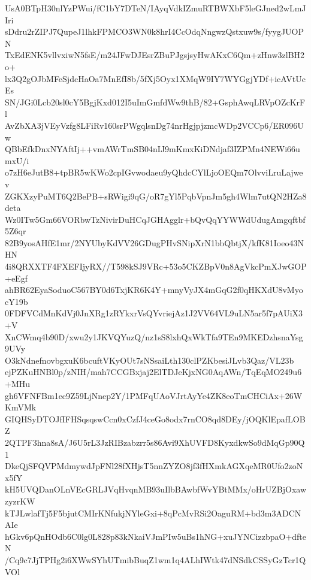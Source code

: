 UsA0BTpH30nlYzPWui/fC1bY7DTeN/IAyqVdkIZmuRTBWXbF5leGJned2wLmJIri
sDdru2rZIPJ7QupeJ1lhkFPMCO3WN0k8hrI4CcOdqNngwzQstxuw9s/fyygJUOPN
TxEdENK5vllvxiwN5fsE/m24JFwDJEsrZBuPJgsjsyHwAKxC6Qm+zHnw3zlBH2o+
lx3Q2gOJbMFeSjdcHaOa7MnEfI8b/5fXj5Oyx1XMqW9IY7WYGgjYDf+icAVtUcEs
SN/JGi0Lcb20sl0cY5BgjKxd012I5uImGmfdWw9thB/82+GsphAwqLRVpOZcKrFl
AvZbXA3jVEyVzfg8LFiRv160srPWgqlsnDg74nrHgjpjzmcWDp2VCCp6/ER096Uw
QBbEfkDnxNYAftIj++vmAWrTmSB04nIJ9mKmxKiDNdjaf3IZPMn4NEWi66umxU/i
o7zH6eJutB8+tpBR5wKWo2cpIGvwodaeu9yQhdcCYlLjoOEQm7OlvviLruLajwev
ZGKXzyPuMT6Q2BePB+sRWigi9qG/oR7gYl5PqbVpnJm5gh4Wlm7utQN2HZa8deta
Wz0ITw5Gm66VORbwTzNivirDuHCqJGHAgglr+bQvQqYYWWdUdugAmgqftbf5Z6qr
82B9yosAHfE1mr/2NYUbyKdVV26GDugPHvSNipXrN1bbQbtjX/kfK81Ioeo43NHN
4i8QRXXTF4FXEFIjyRX//T598kSJ9VRc+53o5CKZBpV0n8AgVkcPmXJwGOP+eEgf
ahBR62EyaSoduoC567BY0d6TxjKR6K4Y+mnyVyJX4mGqG2f0qHKXdU8vMyocY19b
0FDFVCdMnKdVj0JnXRg1zRYkxrVsQYvriejAz1J2VV64VL9uLN5ar5f7pAUiX3+V
XnCWmq4b90D/xwu2y1JKVQYuzQ/nz1sS8lxhQxWkTfa9TEn9MKEDzhsnaYsg9UVy
O3kNdnefnovbgxuK6bcuftVKyOUt7sNSsaiLth130clPZKbesiJLvb3Qaz/VL23b
ejPZKuHNBl0p/zNIH/mah7CCGBxjaj2ElTDJeKjxNG0AqAWn/TqEqMO249u6+MHu
gh6VFNFBm1ec9Z59LjNnep2Y/1PMFqUAoVJrtAyYe4ZK8eoTmCHCiAx+26WKmVMk
GIQHSyDTOJfIFHSqsqswCcn0xCzfJ4ceGo8odx7rnCO8qd8DEy/jOQKlEpafLOBZ
2QTPF3hna8sA/J6U5rL3JzRIBzabzrr5s86Avi9XhUVFD8KyxdkwSo9dMqGp90Q1
DkeQjSFQVPMdmywdJpFNl28fXHjsT5nnZYZO8jf3fHXmkAGXqeMR0Ufo2zoNx5fY
kH5UVQDanOLnVEcGRLJVqHvqnMB93uIlbBAwbfWvYBtMMx/oHrUZBjOxawzyzrKW
kTJLwlafTj5F5bjutCMIrKNfukjNYleGxi+8qPcMvRSi2OaguRM+bd3m3ADCNAIe
hGkv6pQnHOdb6C0lg0L828p83kNkaiVJmPIw5uBs1hNG+xuJYNCizzbpaO+dfteN
/Cq9c7JjTPHg2i6XWwSYhUTmibBuqZ1wm1q4ALhIWtk47dNSdkCSSyGzTcr1QVOl
